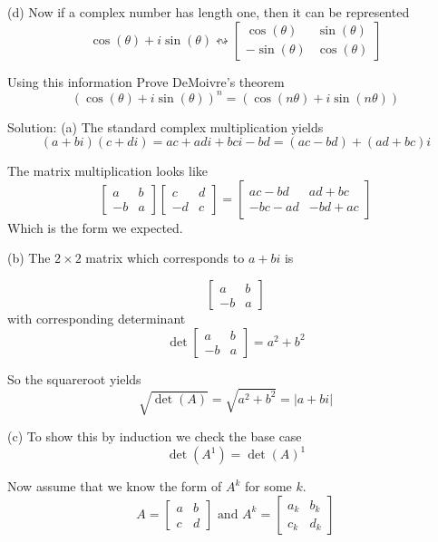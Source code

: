\documentclass[16 pt]{amsart}
\theoremstyle{definition}
\theoremstyle{remark}
\numberwithin{equation}{subsection}
\begin{document}
\vspace{.25in}

(d) Now if a complex number has length one, then it can be represented
\[
\cos(\theta) + i \sin(\theta) \leftrightsquigarrow \begin{bmatrix}
\cos(\theta) & \sin(\theta)\\
-\sin(\theta) & \cos(\theta)
\end{bmatrix}
\]

Using this information Prove DeMoivre's theorem
\[
(\cos(\theta)+i\sin(\theta))^n = (\cos(n\theta)+i\sin(n\theta))
\]


\vspace{.5in}

Solution: (a) The standard complex multiplication yields
\[
(a+bi)(c+di) = ac + adi+bci - bd = (ac-bd)+(ad+bc)i
\]


The matrix multiplication looks like
\[
\begin{bmatrix}
a & b \\ -b & a
\end{bmatrix}
\begin{bmatrix}
c & d \\ -d & c
\end{bmatrix} = 
\begin{bmatrix}
ac-bd & ad+bc \\ -bc-ad & -bd+ac
\end{bmatrix}
\]
Which is the form we expected.

\vspace{.25in}

(b) The $2\times 2$ matrix which corresponds to $a+bi$ is

\[
\begin{bmatrix}
a & b \\ -b & a
\end{bmatrix}
\]
with corresponding determinant
\[
\det \begin{bmatrix}
a & b \\ -b & a
\end{bmatrix} = a^2 + b^2
\]

So the squareroot yields
\[
\sqrt{\det(A)} = \sqrt{a^2+b^2} = |a+bi|
\]

\vspace{.25in}

(c) To show this by induction we check the base case
\[
\det(A^1) = \det(A)^1
\]

Now assume that we know the form of $A^k$ for some $k$.
\[
A = \begin{bmatrix}
a & b \\ c & d
\end{bmatrix} \text{ and } A^k =\begin{bmatrix}
a_k & b_k \\ c_k & d_k
\end{bmatrix}
\]
\end{document}
